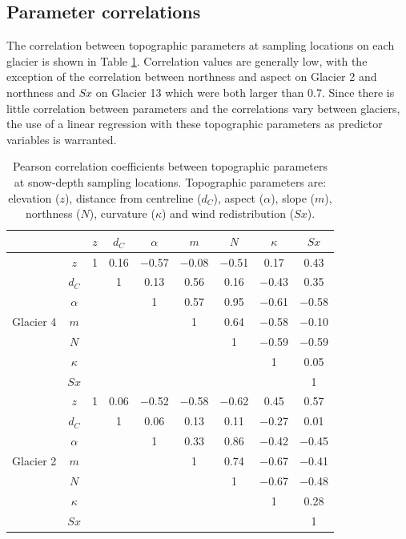 \documentclass{sfuthesis}
\newcommand{\params}{Topographic parameters are: elevation ($z$), distance from centreline ($d_C$), aspect ($\alpha$), slope ($m$), northness ($N$), curvature ($\kappa$) and wind redistribution ($Sx$). }
\begin{document}
{\subsection{Parameter correlations}

The correlation between topographic parameters at sampling locations on each glacier is shown in Table \ref{tab:pearson_correlation}. Correlation values are generally low, with the exception of the correlation between northness and aspect on Glacier 2 and northness and $Sx$ on Glacier 13 which were both larger than 0.7. Since there is little correlation between parameters and the correlations vary between glaciers, the use of a linear regression with these topographic parameters as predictor variables is warranted. 

\begin{table}[H]
\centering
\caption[Pearson correlation coefficients between topographic parameters at snow-depth sampling locations]{Pearson correlation coefficients between topographic parameters at snow-depth sampling locations. \params}
\label{tab:pearson_correlation}
\begin{tabular}{cc|ccccccc}
 &  & $z$ & $d_C$ & $\alpha$ & $m$ & $N$ & $\kappa$ & $Sx$ \\ \hline
\multirow{7}{*}{Glacier 4} & $z$ & 1 & 0.16 & $-$0.57 & $-$0.08 & $-$0.51 & 0.17 & 0.43 \\
 & $d_C$ &  & 1 & 0.13 & 0.56 & 0.16 & $-$0.43 & 0.35 \\
 & $\alpha$ &   &  & 1 & 0.57 & 0.95 & $-$0.61 & $-$0.58 \\
 & $m$ &   &   &   & 1 & 0.64 & $-$0.58 & $-$0.10 \\
 & $N$ &   &   &   &   & 1 & $-$0.59 & $-$0.59 \\
 & $\kappa$ &   &   &   &   &   & 1 & 0.05 \\
 & $Sx$ &   &   &   &   &   &   & 1 \\ \hline
\multirow{7}{*}{Glacier 2} & $z$ & 1 & 0.06 & $-$0.52 & $-$0.58 & $-$0.62 & 0.45 & 0.57 \\
 & $d_C$ &   & 1 & 0.06 & 0.13 & 0.11 & $-$0.27 & 0.01 \\
 & $\alpha$ &   &  & 1 & 0.33 & 0.86 & $-$0.42 & $-$0.45 \\
 & $m$ &   &   &   & 1 & 0.74 & $-$0.67 & $-$0.41 \\
 & $N$ &   &   &   &   & 1 & $-$0.67 & $-$0.48 \\
 & $\kappa$ & &   &   &   &   & 1 & 0.28 \\
 & $Sx$ &   &   &   &   &   &   & 1 \\ \hline

\end{tabular}
\end{table}}
\end{document}
